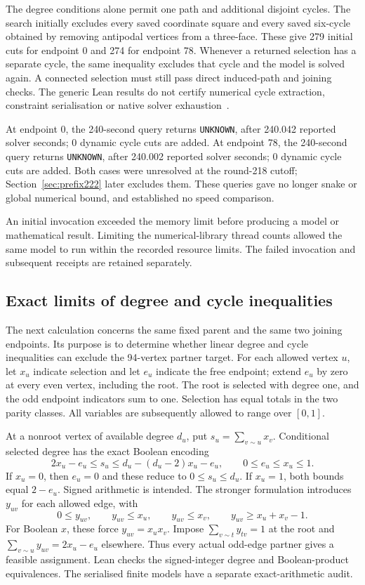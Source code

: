 \documentclass[11pt,a4paper]{article}
\theoremstyle{definition}
\theoremstyle{remark}
\begin{document}
The degree conditions alone permit one path and additional disjoint cycles.
The search initially excludes every saved coordinate square and every
saved six-cycle obtained by removing antipodal vertices from a three-face.
These give 279 initial cuts for endpoint 0 and 274 for endpoint 78.
Whenever a returned selection has a separate cycle, the same inequality
excludes that cycle and the model is solved again. A connected selection
must still pass direct induced-path and joining checks. The generic Lean
results do not certify numerical cycle extraction, constraint serialisation
or native solver exhaustion~\cite{research218}.

At endpoint 0, the 240-second query returns \texttt{UNKNOWN}, after 240.042 reported solver seconds; 0 dynamic cycle cuts are added.
At endpoint 78, the 240-second query returns \texttt{UNKNOWN}, after 240.002 reported solver seconds; 0 dynamic cycle cuts are added.
Both cases were unresolved at the round-218 cutoff; Section~\ref{sec:prefix222} later excludes them. These queries gave no longer snake or global numerical bound, and established no speed comparison.

An initial invocation exceeded the memory limit before producing a model or mathematical result. Limiting the numerical-library thread counts allowed the same model to run within the recorded resource limits. The failed invocation and subsequent receipts are retained separately.


\subsection{Exact limits of degree and cycle inequalities}
\label{sec:linear219}
The next calculation concerns the same fixed parent and the same two
joining endpoints. Its purpose is to determine whether linear degree
and cycle inequalities can exclude the 94-vertex partner target.
For each allowed vertex $u$, let $x_u$ indicate selection and let $e_u$
indicate the free endpoint; extend $e_u$ by zero at every even vertex,
including the root.
The root is selected with degree one, and the odd endpoint indicators
sum to one. Selection has equal totals in the two parity classes.
All variables are subsequently allowed to range over $[0,1]$.

At a nonroot vertex of available degree $d_u$, put
$s_u=\sum_{v\sim u}x_v$. Conditional selected degree has the exact
Boolean encoding
\[
2x_u-e_u\le s_u\le d_u-(d_u-2)x_u-e_u,
\qquad 0\le e_u\le x_u\le1.
\]
If $x_u=0$, then $e_u=0$ and these reduce to $0\le s_u\le d_u$.
If $x_u=1$, both bounds equal $2-e_u$. Signed arithmetic is intended.
The stronger formulation introduces $y_{uv}$ for each allowed edge, with
\[
0\le y_{uv},\qquad y_{uv}\le x_u,\qquad y_{uv}\le x_v,
\qquad y_{uv}\ge x_u+x_v-1.
\]
For Boolean $x$, these force $y_{uv}=x_ux_v$. Impose
$\sum_{v\sim t}y_{tv}=1$ at the root and
$\sum_{v\sim u}y_{uv}=2x_u-e_u$ elsewhere. Thus every actual odd-edge
partner gives a feasible assignment. Lean checks the signed-integer
degree and Boolean-product equivalences. The serialised finite models
have a separate exact-arithmetic audit.
\end{document}
